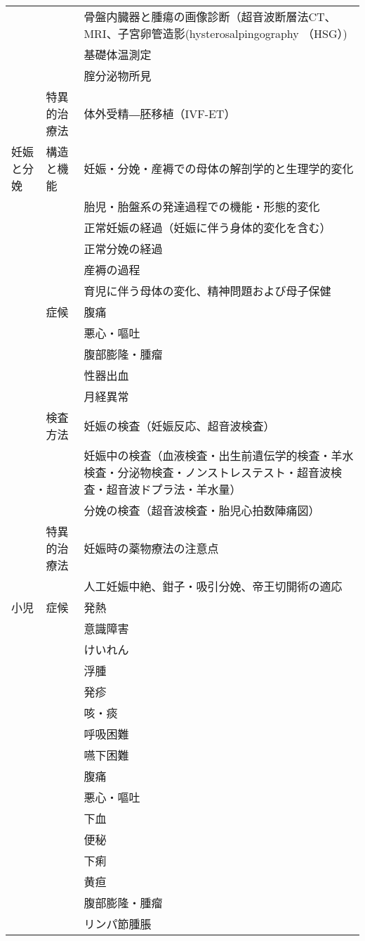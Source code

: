 \begin{xltabular}{\linewidth}{XXX}
 &  & 骨盤内臓器と腫瘍の画像診断（超音波断層法CT、MRI、子宮卵管造影(hysterosalpingography （HSG）) \\
 &  & 基礎体温測定 \\
 &  & 腟分泌物所見 \\
 & 特異的治療法 & 体外受精―胚移植（IVF-ET） \\
妊娠と分娩 & 構造と機能 & 妊娠・分娩・産褥での母体の解剖学的と生理学的変化 \\
 &  & 胎児・胎盤系の発達過程での機能・形態的変化 \\
 &  & 正常妊娠の経過（妊娠に伴う身体的変化を含む） \\
 &  & 正常分娩の経過 \\
 &  & 産褥の過程 \\
 &  & 育児に伴う母体の変化、精神問題および母子保健 \\
 & 症候 & 腹痛 \\
 &  & 悪心・嘔吐 \\
 &  & 腹部膨隆・腫瘤 \\
 &  & 性器出血 \\
 &  & 月経異常 \\
 & 検査方法 & 妊娠の検査（妊娠反応、超音波検査） \\
 &  & 妊娠中の検査（血液検査・出生前遺伝学的検査・羊水検査・分泌物検査・ノンストレステスト・超音波検査・超音波ドプラ法・羊水量） \\
 &  & 分娩の検査（超音波検査・胎児心拍数陣痛図） \\
 & 特異的治療法 & 妊娠時の薬物療法の注意点 \\
 &  & 人工妊娠中絶、鉗子・吸引分娩、帝王切開術の適応 \\
小児 & 症候 & 発熱 \\
 &  & 意識障害 \\
 &  & けいれん \\
 &  & 浮腫 \\
 &  & 発疹 \\
 &  & 咳・痰 \\
 &  & 呼吸困難 \\
 &  & 嚥下困難 \\
 &  & 腹痛 \\
 &  & 悪心・嘔吐 \\
 &  & 下血 \\
 &  & 便秘 \\
 &  & 下痢 \\
 &  & 黄疸 \\
 &  & 腹部膨隆・腫瘤 \\
 &  & リンパ節腫脹 \\

\end{xltabular}
